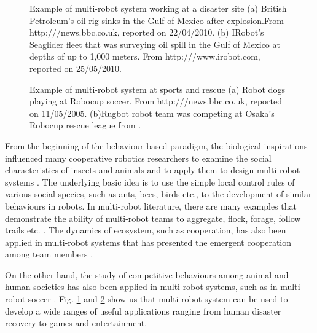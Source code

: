 \begin{figure}
\centering
{} 
\hspace{0.25cm}
\caption{Example of multi-robot system working at a disaster site (a) British Petroleum's oil rig sinks in the Gulf of Mexico after explosion.\protect\newline From http:///news.bbc.co.uk, reported on 22/04/2010. 
(b) IRobot's Seaglider fleet that was surveying oil spill in the Gulf of Mexico at depths of up to 1,000 meters. From http:///www.irobot.com, reported on 25/05/2010.}
\label{fig:bp-oil-disaster}
\end{figure}
\begin{figure}
\centering
{} 
\hspace{0.25cm}
\caption{Example of multi-robot system at sports and rescue (a) Robot dogs playing at Robocup soccer. \protect\newline From http:///news.bbc.co.uk, reported on 11/05/2005. 
(b)Rugbot robot team was competing at Osaka's Robocup rescue league from \protect{}.}
\label{fig:robocup}
\end{figure}
From the beginning of the behaviour-based paradigm, the biological inspirations influenced many cooperative robotics researchers to examine the social characteristics of insects and animals and to apply them to design multi-robot systems \cite{Arkin1998}. The underlying basic idea is to use the simple local control rules of various social species, such as ants, bees, birds etc., to the development of similar behaviours in robots. In multi-robot literature, there are many examples that demonstrate the ability of multi-robot teams to aggregate, flock, forage, follow trails etc. \cite{Bonabeau+1999}. The dynamics of ecosystem, such as cooperation, has also been applied in multi-robot systems that has presented the emergent cooperation among team members \cite{Mcfarland1994,Martinoli+1996}. 

On the other hand, the study of competitive behaviours among animal and human societies has also been applied in multi-robot systems, such as in multi-robot soccer \cite{Asada+1999}. Fig. \ref{fig:bp-oil-disaster} and \ref{fig:robocup} show us that multi-robot system can be used to develop a wide ranges of useful applications ranging from human disaster recovery to games and entertainment.

